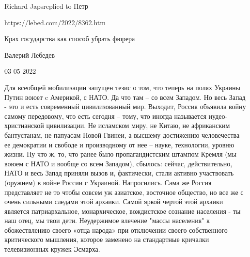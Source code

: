 Richard Japsreplied to Петр

https://lebed.com/2022/8362.htm

Крах государства как способ убрать фюрера

Валерий Лебедев

03-05-2022 

Для всеобщей мобилизации запущен тезис о том,
что
теперь на полях Украины Путин воюет c Америкой, с НАТО. Да что
там – со
всем Западом. Но весь Запад - это и есть современный
цивилизованный мир.
Выходит, Россия объявила войну самому передовому, что есть
сегодня –
тому, что иногда называется иудео-христианской цивилизации. Не
исламском миру,
не Китаю, не африканским бантустанам, не папуасам Новой Гвинеи, а
высшему
достижению человечества – ее демократии и свободе и производному
от нее –
науке, технологии, уровню жизни. Ну что ж, то, что ранее было
пропагандистским штампом Кремля (мы воюем с НАТО и вообще со всем
Западом),
сбылось: сейчас, действительно, НАТО и весь Запад приняли вызов и,
фактически,
стали активно участвовать (оружием) в войне России с Украиной.
Напросились.
Сама же Россия представляет не то чтобы совсем уж азиатское,
восточное
общество, но все же с очень сильными следами этой архаики. Самой
яркой
чертой этой архаики является патриархальное, монархическое,
вождистское
сознание населения - ты наш отец, мы твои дети. Неудержимое
влечение
"массы населения" к обожествлению своего «отца народа» при
отключении
своего собственного критического мышления, которое заменено на
стандартные кричалки телевизионных кружек Эсмарха.

